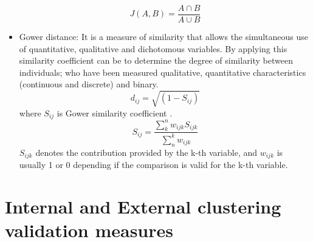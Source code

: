 \begin{itemize}
    \begin{equation}
        J(A,B) = \frac{A \cap B}{A \cup B}
    \end{equation}
    \item Gower distance: It is a measure of similarity that allows the simultaneous use of quantitative, qualitative and dichotomous variables. By applying this similarity coefficient can be to determine the degree of similarity between individuals; who have been measured qualitative, quantitative characteristics (continuous and discrete) and binary.
    \begin{equation}
        d_{ij}=\sqrt{(1-S_{ij})}
    \end{equation}
    where $S_{ij}$ is Gower similarity coefficient \citep{b62}.
    \begin{equation}
        S_{ij}=\frac{\sum_{k}^{n}w_{ijk}S_{ijk}}{\sum_{n}^{k}w_{ijk}}
    \end{equation}
    $S_{ijk}$ denotes the contribution provided by the k-th variable, and $w_{ijk}$ is usually 1 or 0 depending if the comparison is valid for the k-th variable.
\end{itemize}

\section {Internal and External clustering validation measures} \label{sec:seccion2}

